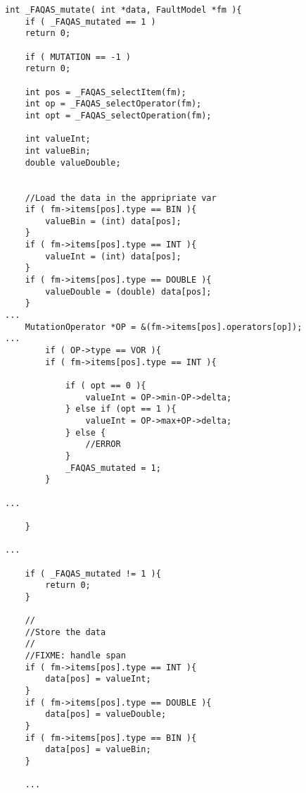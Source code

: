 
\begin{minipage}{15cm}
\begin{lstlisting}[style=CStyle, caption=Mutation API function., label=mutationProbe, mathescape=true]
int _FAQAS_mutate( int *data, FaultModel *fm ){
    if ( _FAQAS_mutated == 1 )
    return 0;

    if ( MUTATION == -1 )
    return 0;

    int pos = _FAQAS_selectItem(fm);
    int op = _FAQAS_selectOperator(fm);
    int opt = _FAQAS_selectOperation(fm);

    int valueInt;
    int valueBin;
    double valueDouble;


    //Load the data in the appripriate var
    if ( fm->items[pos].type == BIN ){
        valueBin = (int) data[pos];
    }
    if ( fm->items[pos].type == INT ){
        valueInt = (int) data[pos];
    }
    if ( fm->items[pos].type == DOUBLE ){
        valueDouble = (double) data[pos];
    }
...
    MutationOperator *OP = &(fm->items[pos].operators[op]);    
...     
        if ( OP->type == VOR ){
        if ( fm->items[pos].type == INT ){

            if ( opt == 0 ){
                valueInt = OP->min-OP->delta;
            } else if (opt == 1 ){
                valueInt = OP->max+OP->delta;
            } else {
                //ERROR
            }
            _FAQAS_mutated = 1;
        }

...

    }

...

    if ( _FAQAS_mutated != 1 ){
        return 0;
    }

    //
    //Store the data
    //
    //FIXME: handle span
    if ( fm->items[pos].type == INT ){
        data[pos] = valueInt;
    }
    if ( fm->items[pos].type == DOUBLE ){
        data[pos] = valueDouble;
    }
    if ( fm->items[pos].type == BIN ){
        data[pos] = valueBin;
    }
    
    ...

    
\end{lstlisting}
\end{minipage}

